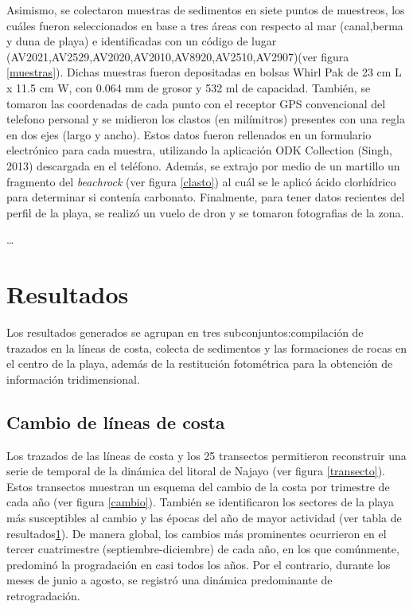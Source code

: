 \documentclass[11pt,]{article}
\begin{document}
Asimismo, se colectaron muestras de sedimentos en siete puntos de
muestreos, los cuáles fueron seleccionados en base a tres áreas con
respecto al mar (canal,berma y duna de playa) e identificadas con un
código de lugar (AV2021,AV2529,AV2020,AV2010,AV8920,AV2510,AV2907)(ver
figura \ref{muestras}). Dichas muestras fueron depositadas en bolsas
Whirl Pak de 23 cm L x 11.5 cm W, con 0.064 mm de grosor y 532 ml de
capacidad. También, se tomaron las coordenadas de cada punto con el
receptor GPS convencional del telefono personal y se midieron los
clastos (en milímitros) presentes con una regla en dos ejes (largo y
ancho). Estos datos fueron rellenados en un formulario electrónico para
cada muestra, utilizando la aplicación ODK Collection (Singh, 2013)
descargada en el teléfono. Además, se extrajo por medio de un martillo
un fragmento del \emph{beachrock} (ver figura \ref{clasto}) al cuál se
le aplicó ácido clorhídrico para determinar si contenía carbonato.
Finalmente, para tener datos recientes del perfil de la playa, se
realizó un vuelo de dron y se tomaron fotografias de la zona.

\ldots

\section{Resultados}\label{resultados}

Los resultados generados se agrupan en tres subconjuntos:compilación de
trazados en la líneas de costa, colecta de sedimentos y las formaciones
de rocas en el centro de la playa, además de la restitución fotométrica
para la obtención de información tridimensional.

\subsection{Cambio de líneas de
costa}\label{cambio-de-luxedneas-de-costa}

Los trazados de las líneas de costa y los 25 transectos permitieron
reconstruir una serie de temporal de la dinámica del litoral de Najayo
(ver figura \ref{transecto}). Estos transectos muestran un esquema del
cambio de la costa por trimestre de cada año (ver figura \ref{cambio}).
También se identificaron los sectores de la playa más susceptibles al
cambio y las épocas del año de mayor actividad (ver tabla de
resultados\ref{resultados}). De manera global, los cambios más
prominentes ocurrieron en el tercer cuatrimestre (septiembre-diciembre)
de cada año, en los que comúnmente, predominó la progradación en casi
todos los años. Por el contrario, durante los meses de junio a agosto,
se registró una dinámica predominante de retrogradación.
\end{document}
